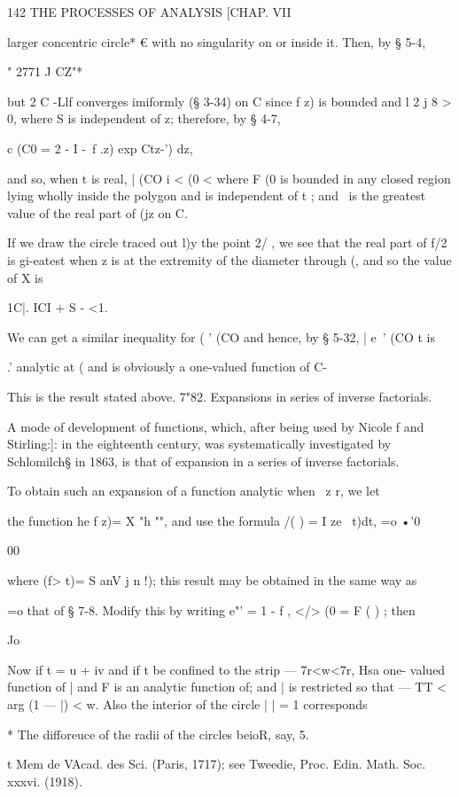 {142 THE PROCESSES OF ANALYSIS [CHAP. VII

larger concentric circle* € with no singularity on or inside it. Then,
by § 5-4,

" 2771 J CZ"*

but 2 C -Llf converges imiformly (§ 3-34) on C since f z) is bounded
and l 2 j 8 > 0, where S is independent of z; therefore, by § 4-7,

c (C0 = 2 - I -\ f .z) exp Ctz-') dz,

and so, when t is real, | (CO i < (0 < where F (0 is bounded in any
closed region lying wholly inside the polygon and is independent of t
; and \ is the greatest value of the real part of (jz on C.

If we draw the circle traced out l)y the point 2/ , we see that the
real part of f/2 is gi-eatest when z is at the extremity of the
diameter through (, and so the value of X is

1C|. ICI + S - <1.

We can get a similar inequality for ( ' (CO and hence, by § 5-32, |
e~' (CO t is

.' analytic at ( and is obviously a one-valued function of C-

This is the result stated above. 7"82. Expansions in series of inverse
factorials.

A mode of development of functions, which, after being used by Nicole
f and Stirling:]: in the eighteenth century, was systematically
investigated by Schlomilch§ in 1863, is that of expansion in a series
of inverse factorials.

To obtain such an expansion of a function analytic when \ z r, we let

the function he f z)= X "h "", and use the formula /( ) = I ze~ t)dt,
=o •'0

00

where (f> t)= S anV j n !); this result may be obtained in the same
way as

 =o that of § 7-8. Modify this by writing e"' = 1 - f , </> (0 = F ( )
; then

Jo

Now if t = u + iv and if t be confined to the strip — 7r<w<7r, Hsa
one- valued function of | and F is an analytic function of; and | is
restricted so that — TT < arg (1 — |) < w. Also the interior of the
circle | | = 1 corresponds

* The difforeuce of the radii of the circles beioR, say, 5.

t Mem de VAcad. des Sci. (Paris, 1717); see Tweedie, Proc. Edin. Math.
Soc. xxxvi. (1918).

}
